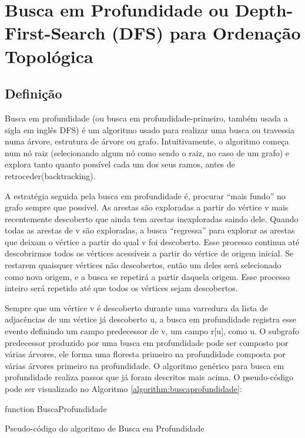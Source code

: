 \documentclass[a4paper,12pt]{article}
\begin{document}
\newpage
\section{Busca em Profundidade ou Depth-First-Search (DFS) para Ordenação Topológica}

\subsection{Definição}
Busca em profundidade (ou busca em profundidade-primeiro, também usada a sigla em inglês DFS) é um algoritmo usado para realizar uma busca ou travessia numa árvore, estrutura de árvore ou grafo. Intuitivamente, o algoritmo começa num nó raiz (selecionando algum nó como sendo o raiz, no caso de um grafo) e explora tanto quanto possível cada um dos seus ramos, antes de retroceder(backtracking).

A estratégia seguida pela busca em profundidade é, procurar “mais fundo” no grafo sempre que possível. As arestas são exploradas a partir do vértice v mais recentemente descoberto que ainda tem arestas inexploradas saindo dele. Quando todas as arestas de v são exploradas, a busca “regressa” para explorar as arestas que deixam o vértice a partir do qual v foi descoberto. Esse processo continua até descobrirmos todos os vértices acessíveis a partir do vértice de origem inicial. Se restarem quaisquer vértices não descobertos, então um deles será selecionado como  nova origem, e a busca se repetirá a partir daquela origem. Esse processo inteiro será repetido até que todos os vértices sejam descobertos.

Sempre que um vértice v é descoberto durante uma varredura da lista de adjacências de um vértice já descoberto u, a busca em profundidade registra esse evento definindo um campo predecessor de v, um campo r[u], como u. O subgrafo predecessor produzido por uma busca em profundidade pode ser composto por várias árvores, ele forma uma floresta primeiro na profundidade composta por várias árvores primeiro na profundidade.
O algoritmo genérico para busca em profundidade realiza passos que já foram descritos mais acima. O pseudo-código pode ser visualizado no Algoritmo \ref{algorithm:buscaprofundidade}:\\ 
\begin{algorithm}[H]
\LinesNumbered
\SetAlgoLined
{}
function BuscaProfundidade
\caption{Pseudo-código do algoritmo de Busca em Profundidade}
\label{algorithm:buscaprofundidade}
\end{algorithm}
\end{document}
